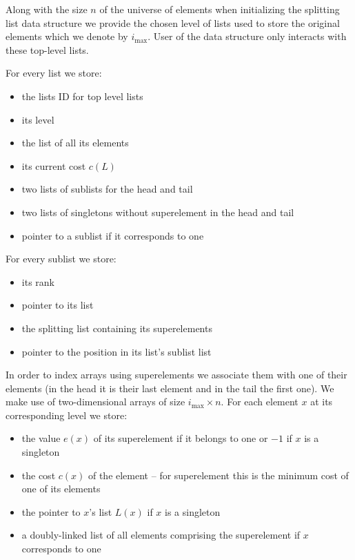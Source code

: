 Along with the size $n$ of the universe of elements when initializing the splitting list data structure we provide the chosen level of lists used to store the original elements which we denote by $i_{\max}$. User of the data structure only interacts with these top-level lists.

For every list we store:

\begin{itemize}
    \item the lists ID for top level lists
    \item its level
    \item the list of all its elements
    \item its current cost $c(L)$
    \item two lists of sublists for the head and tail
    \item two lists of singletons without superelement in the head and tail
    \item pointer to a sublist if it corresponds to one
\end{itemize}

For every sublist we store:

\begin{itemize}
    \item its rank
    \item pointer to its list
    \item the splitting list containing its superelements
    \item pointer to the position in its list's sublist list
\end{itemize}

In order to index arrays using superelements we associate them with one of their elements (in the head it is their last element and in the tail the first one). We make use of two-dimensional arrays of size $i_{\max} \times n$. For each element $x$ at its corresponding level we store:

\begin{itemize}
    \item the value $e(x)$ of its superelement if it belongs to one or $-1$ if $x$ is a singleton
    \item the cost $c(x)$ of the element – for superelement this is the minimum cost of one of its elements
    \item the pointer to $x$'s list $L(x)$ if $x$ is a singleton
    \item a doubly-linked list of all elements comprising the superelement if $x$ corresponds to one
\end{itemize}

